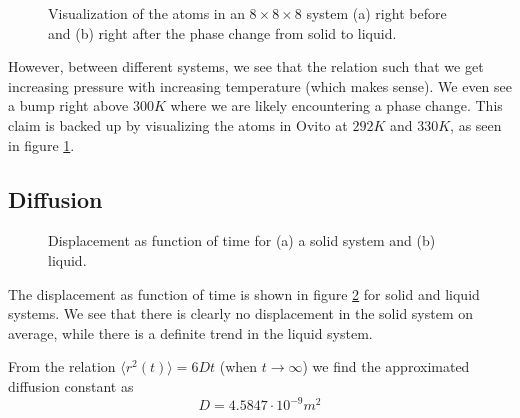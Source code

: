 \documentclass[reprint,floatfix,amsmath,amssymb,aps,pra]{revtex4-1}
\begin{document}
\begin{figure}
    \centering
     \label{fig:phase-visual-solid}
     \label{fig:phase-visual-liquid}
  \caption{Visualization of the atoms in an $8 \times 8 \times 8$ system (a) right before and (b) right after the phase change from solid to liquid.}
  \label{fig:phase-visual}
\end{figure}

However, between different systems, we see that the relation such that we get increasing pressure with increasing temperature (which makes sense). We even see a bump right above $300 \unit{K}$ where we are likely encountering a phase change. This claim is backed up by visualizing the atoms in Ovito at $292 \unit{K}$ and $330 \unit{K}$, as seen in figure \ref{fig:phase-visual}.

\subsection{Diffusion}

\begin{figure}
    \centering
     \label{fig:displacement-solid}
     \label{fig:displacement-liquid}
  \caption{Displacement as function of time for (a) a solid system and (b) liquid.}
  \label{fig:displacement}
\end{figure}

The displacement as function of time is shown in figure \ref{fig:displacement} for solid and liquid systems. We see that there is clearly no displacement in the solid system on average, while there is a definite trend in the liquid system.

From the relation $\langle r^2(t) \rangle = 6Dt$ (when $t \to \infty$) we find the approximated diffusion constant as
\begin{equation}
  D = 4.5847 \cdot 10^{-9} \unit{m^{2}}
\end{equation} 
\end{document}
